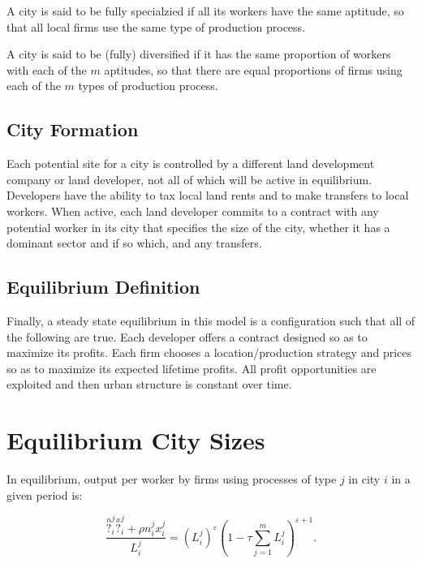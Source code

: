 \begin{definition}
  A city is said to be fully specialzied if all its workers have the same aptitude, so that all local firms use the same type of production process.
\end{definition}

\begin{definition}
 A city is said to be (fully) diversified if it has the same proportion of workers with each of the $m$ aptitudes, so that there are equal proportions of firms using each of the $m$ types of production process. 
\end{definition}

\subsection{City Formation}

Each potential site for a city is controlled by a different land development company or land developer, not all of which will be active in equilibrium. Developers have the ability to tax local land rents and to make transfers to local workers. When active, each land developer commits to a contract with any potential worker in its city that specifies the size of the city, whether it has a dominant sector and if so which, and any transfers.

\subsection{Equilibrium Definition}

Finally, a steady state equilibrium in this model is a configuration such that all of the following are true. Each developer offers a contract designed so as to maximize its profits. Each firm chooses a location/production strategy and prices so as to maximize its expected lifetime profits. All profit opportunities are exploited and then urban structure is constant over time.

\section{Equilibrium City Sizes}

\begin{lemma}
  In equilibrium, output per worker by firms using processes of type $j$ in city $i$ in a given period is:

  \begin{equation*}
    \frac{\overset{n}{?}_i^j \overset{x}{?}_i^j + \rho n_i^j x_i^j}{L_i^j} = (L_i^j)^{\varepsilon} (1 - \tau \sum_{j=1}^m L_i^j)^{\varepsilon + 1}.
  \end{equation*}
\end{lemma}
